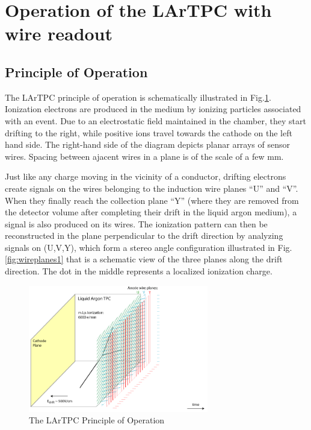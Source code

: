 \documentclass[a4paper]{jpconf}
\begin{document}
\section{Operation of the LArTPC with wire readout}
\subsection{Principle of Operation}

The LArTPC principle of operation is schematically illustrated in Fig.\ref{fig:lartpc-principle}.
Ionization electrons are produced in the medium by ionizing particles associated with an event.
Due to an electrostatic field maintained in the chamber, they start drifting to the right, while
positive ions travel towards the cathode on the left hand side. The right-hand side of the diagram
depicts planar arrays of sensor wires. Spacing between ajacent wires in a plane is of the scale of a few mm.

Just like any charge moving in the vicinity of
a conductor, drifting electrons create signals on the wires belonging to the induction wire planes ``U''
and ``V''. When they finally reach the collection plane ``Y''
(where they are removed from the detector volume after completing their drift in the liquid argon medium),
a signal is also produced on its wires.
The ionization pattern can then be reconstructed  in the plane perpendicular to the drift direction by analyzing signals on (U,V,Y),
which form a stereo angle configuration illustrated in Fig.\ref{fig:wireplanes1} that is a schematic view of the three planes
along the drift direction. The dot in the middle represents a localized ionization charge.
\begin{figure}[h!]
	\centering
	\includegraphics[width=0.7\textwidth]{signal-0.png}
	\caption{The LArTPC Principle of Operation}
	\label{fig:lartpc-principle}
\end{figure}
\end{document}
